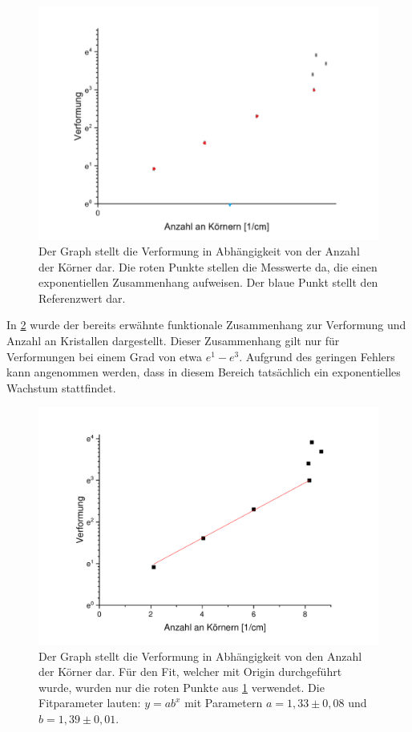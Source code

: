 \documentclass[
	a4paper,
	12pt,
	pagesize,
	ngerman
]{scrartcl}
\begin{document}
\begin{figure}[h!]
    \centering
    \includegraphics[scale = 0.6]{te.png}
    \caption{Der Graph stellt die Verformung in Abhängigkeit von der Anzahl der Körner dar. Die roten Punkte stellen die Messwerte da, die einen exponentiellen Zusammenhang aufweisen. Der blaue Punkt stellt den Referenzwert dar.}
    \label{A2}
\end{figure}
In \cref{A3} wurde der bereits erwähnte funktionale Zusammenhang zur Verformung und Anzahl an Kristallen dargestellt. Dieser Zusammenhang gilt nur für Verformungen bei einem Grad von etwa $e^1 - e^3$. Aufgrund des geringen Fehlers kann angenommen werden, dass in diesem Bereich tatsächlich ein exponentielles Wachstum stattfindet.
\begin{figure}[h!]
    \centering
    \includegraphics[scale = 0.6]{fitfit.pdf}
    \caption{Der Graph stellt die Verformung in Abhängigkeit von den Anzahl der Körner dar. Für den Fit, welcher mit Origin durchgeführt wurde, wurden nur die roten Punkte aus \cref{A2} verwendet. Die Fitparameter lauten:
    $y=ab^x$ mit Parametern $a=1,33\pm 0,08$ und $b = 1,39 \pm 0,01$.}
    \label{A3}
\end{figure}
\end{document}
